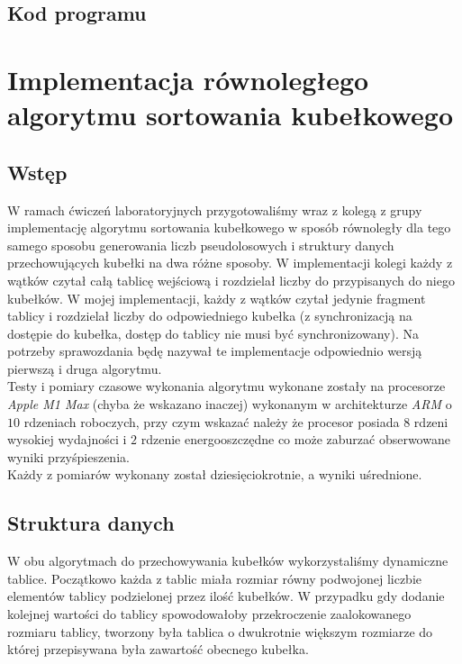 \documentclass{article}
\begin{document}
        \subsection{Kod programu}
        
        
        
        
    \newpage 
    
    \section{Implementacja równoległego algorytmu sortowania kubełkowego}
    \subsection{Wstęp}
    W ramach ćwiczeń laboratoryjnych przygotowaliśmy wraz z kolegą z grupy implementację algorytmu sortowania kubełkowego w sposób równoległy dla tego samego sposobu generowania liczb pseudolosowych i struktury danych przechowujących kubełki na dwa różne sposoby. W implementacji kolegi każdy z wątków czytał całą tablicę wejściową i rozdzielał liczby do przypisanych do niego kubełków. W mojej implementacji, każdy z wątków czytał jedynie fragment tablicy i rozdzielał liczby do odpowiedniego kubełka (z synchronizacją na dostępie do kubełka, dostęp do tablicy nie musi być synchronizowany). Na potrzeby sprawozdania będę nazywał te implementacje odpowiednio wersją pierwszą i druga algorytmu. \\
    
    Testy i pomiary czasowe wykonania algorytmu wykonane zostały na procesorze \textit{Apple M1 Max} (chyba że wskazano inaczej) wykonanym w architekturze \textit{ARM} o $10$ rdzeniach roboczych, przy czym wskazać należy że procesor posiada $8$ rdzeni wysokiej wydajności i $2$ rdzenie energooszczędne co może zaburzać obserwowane wyniki przyśpieszenia.  \\
    Każdy z pomiarów wykonany został dziesięciokrotnie, a wyniki uśrednione. 
        
    \subsection{Struktura danych}
    W obu algorytmach do przechowywania kubełków wykorzystaliśmy dynamiczne tablice. Początkowo każda z tablic miała rozmiar równy podwojonej liczbie elementów tablicy podzielonej przez ilość kubełków. W przypadku gdy dodanie kolejnej wartości do tablicy spowodowałoby przekroczenie zaalokowanego rozmiaru tablicy, tworzony była tablica o dwukrotnie większym rozmiarze do której przepisywana była zawartość obecnego kubełka. \\
    
\end{document}
